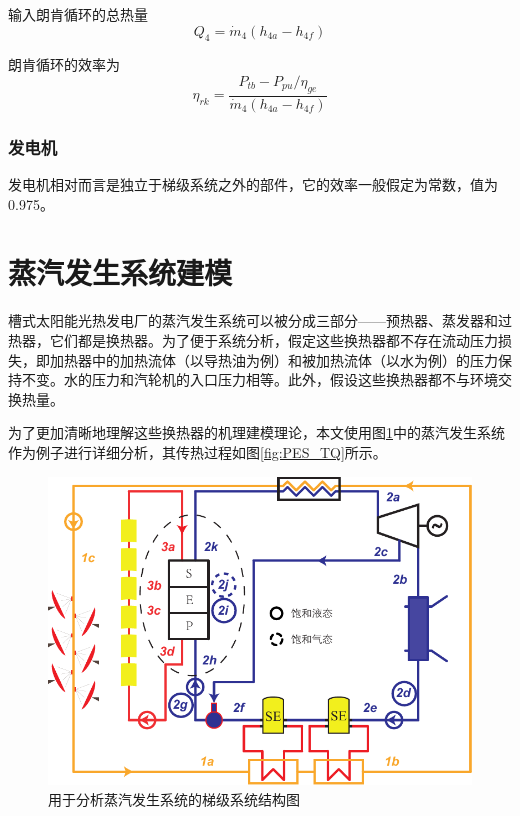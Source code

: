 输入朗肯循环的总热量
\begin{equation}
    Q_4=\dot{m}_4(h_{4a}-h_{4f})
\end{equation}

朗肯循环的效率为
\begin{equation}
	\eta_{rk}=\dfrac{P_{tb}-P_{pu}/\eta_{ge}}{\dot{m}_4(h_{4a}-h_{4f})}
\end{equation}

\subsubsection{发电机}
发电机相对而言是独立于梯级系统之外的部件，它的效率一般假定为常数，值为0.975。

\section{蒸汽发生系统建模}
槽式太阳能光热发电厂的蒸汽发生系统可以被分成三部分——预热器、蒸发器和过热器，它们都是换热器。为了便于系统分析，假定这些换热器都不存在流动压力损失，即加热器中的加热流体（以导热油为例）和被加热流体（以水为例）的压力保持不变。水的压力和汽轮机的入口压力相等。此外，假设这些换热器都不与环境交换热量。

为了更加清晰地理解这些换热器的机理建模理论，本文使用图\ref{fig:PES}中的蒸汽发生系统作为例子进行详细分析，其传热过程如图\ref{fig:PES_TQ}所示。


\noindent \begin{figure}[!ht]
\begin{center}
	\includegraphics[width = 0.8\columnwidth]{fig/PES}
	\caption{用于分析蒸汽发生系统的梯级系统结构图}
	\label{fig:PES}
\end{center}
\end{figure}

